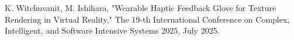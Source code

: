\label{ap:research_list}



%

	\begin{enumerate}
		 K. Witchuvanit, M. Ishihara, "Wearable Haptic Feedback Glove for Texture Rendering in Virtual Reality," The 19-th International Conference on Complex, Intelligent, and Software Intensive Systems 2025, July 2025.
	\end{enumerate}
	
	
